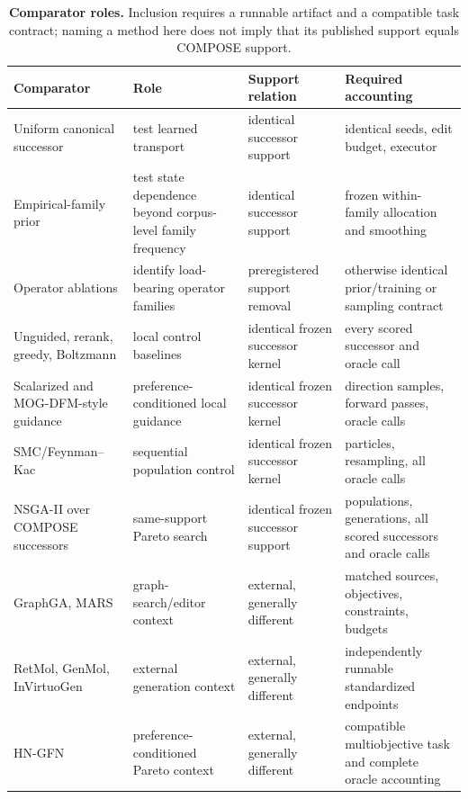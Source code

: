 \begin{table}[htbp]
  \centering
  \caption{\textbf{Comparator roles.} Inclusion requires a runnable artifact
  and a compatible task contract; naming a method here does not imply that its
  published support equals COMPOSE support.}
  \label{tab:appendix-comparators}
  \small
  \begin{tabularx}{\linewidth}{@{}lYYY@{}}
    \toprule
    Comparator & Role & Support relation & Required accounting \\
    \midrule
    Uniform canonical successor &
    test learned transport &
    identical successor support &
    identical seeds, edit budget, executor \\
    Empirical-family prior &
    test state dependence beyond corpus-level family frequency &
    identical successor support &
    frozen within-family allocation and smoothing \\
    Operator ablations &
    identify load-bearing operator families &
    preregistered support removal &
    otherwise identical prior/training or sampling contract \\
    Unguided, rerank, greedy, Boltzmann &
    local control baselines &
    identical frozen successor kernel &
    every scored successor and oracle call \\
    Scalarized and MOG-DFM-style guidance &
    preference-conditioned local guidance &
    identical frozen successor kernel &
    direction samples, forward passes, oracle calls \\
    SMC/Feynman--Kac &
    sequential population control &
    identical frozen successor kernel &
    particles, resampling, all oracle calls \\
    NSGA-II over COMPOSE successors &
    same-support Pareto search &
    identical frozen successor support &
    populations, generations, all scored successors and oracle calls \\
    GraphGA, MARS &
    graph-search/editor context &
    external, generally different &
    matched sources, objectives, constraints, budgets \\
    RetMol, GenMol, InVirtuoGen &
    external generation context &
    external, generally different &
    independently runnable standardized endpoints \\
    HN-GFN &
    preference-conditioned Pareto context &
    external, generally different &
    compatible multiobjective task and complete oracle accounting \\
    \bottomrule
  \end{tabularx}
\end{table}

